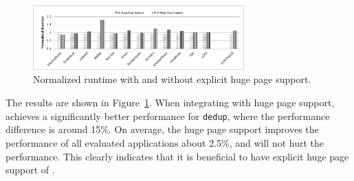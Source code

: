 \begin{figure}[!h]
    \centering
    \includegraphics[width=3.2in]{figure/hugepage.pdf}
    \caption{Normalized runtime with and without explicit huge page support.}
    \label{fig:hugepage}
\end{figure}

The results are shown in Figure~\ref{fig:hugepage}. When integrating with huge page support, \NM{} achieves a significantly better performance for \texttt{dedup}, where the performance difference is around 15\%. On average, the huge page support improves the performance of all evaluated applications about 2.5\%, and will not hurt the performance. This clearly indicates that it is beneficial to have explicit huge page support of \NM{}.  


